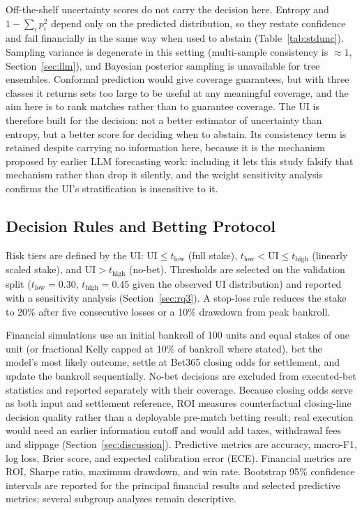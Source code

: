 \documentclass[10pt]{article}
\begin{document}
Off-the-shelf uncertainty scores do not carry the decision here. Entropy and
$1-\sum_i p_i^2$ depend only on the predicted distribution, so they restate
confidence and fail financially in the same way when used to abstain
(Table~\ref{tab:stdunc}). Sampling variance is degenerate in this setting
(multi-sample consistency is $\approx 1$, Section~\ref{sec:llm}), and Bayesian
posterior sampling is unavailable for tree ensembles. Conformal prediction would
give coverage guarantees, but with three classes it returns sets too large to be
useful at any meaningful coverage, and the aim here is to rank matches rather
than to guarantee coverage. The UI is therefore built for the decision: not a
better estimator of uncertainty than entropy, but a better score for deciding
when to abstain. Its consistency term is retained despite carrying no
information here, because it is the mechanism proposed by earlier LLM
forecasting work: including it lets this study falsify that mechanism rather
than drop it silently, and the weight sensitivity analysis confirms the UI's
stratification is insensitive to it.

\subsection{Decision Rules and Betting Protocol}
\label{sec:betting}
Risk tiers are defined by the UI: $\mathrm{UI} \le t_{\mathrm{low}}$ (full
stake), $t_{\mathrm{low}} < \mathrm{UI} \le t_{\mathrm{high}}$ (linearly scaled
stake), and $\mathrm{UI} > t_{\mathrm{high}}$ (no-bet). Thresholds are selected
on the validation split ($t_{\mathrm{low}} = 0.30$, $t_{\mathrm{high}} = 0.45$
given the observed UI distribution) and reported with a sensitivity analysis
(Section~\ref{sec:rq3}). A stop-loss rule reduces the stake to 20\% after five
consecutive losses or a 10\% drawdown from peak bankroll.

Financial simulations use an initial bankroll of 100
units and equal stakes of one unit (or fractional Kelly capped at 10\% of bankroll
where stated), bet the model's most likely outcome, settle at Bet365 closing odds
for settlement, and update the bankroll sequentially. No-bet decisions are
excluded from executed-bet statistics and reported separately with their
coverage. Because closing odds serve as both input and settlement reference, ROI
measures counterfactual closing-line decision quality rather than a deployable
pre-match betting result; real execution would need an earlier information
cutoff and would add taxes, withdrawal fees and slippage
(Section~\ref{sec:discussion}). Predictive metrics are accuracy, macro-F1, log
loss, Brier score, and expected calibration error (ECE). Financial metrics are
ROI, Sharpe ratio, maximum drawdown, and win rate. Bootstrap 95\% confidence
intervals are reported for the principal financial results and selected
predictive metrics; several subgroup analyses remain descriptive.
\end{document}
